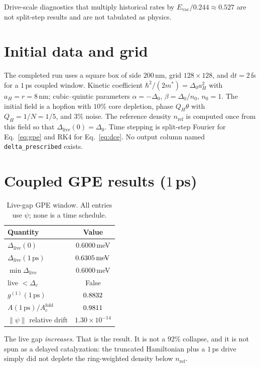 \documentclass[11pt,letterpaper]{article}
\begin{document}
Drive-scale diagnostics that multiply historical rates by $E_{\mathrm{vac}}/0.244\approx 0.527$ are not split-step results and are not tabulated as physics.

\section{Initial data and grid}
\label{sec:grid}

The completed run uses a square box of side $200$\,nm, grid $128\times 128$, and $\mathrm{d}t=2$\,fs for a $1$\,ps coupled window. Kinetic coefficient $\hbar^2/(2m^*)=\Delta_0 a_H^2$ with $a_H=r=8$\,nm; cubic--quintic parameters $\alpha=-\Delta_0$, $\beta=\Delta_0/n_0$, $n_0=1$. The initial field is a hopfion with $10\%$ core depletion, phase $Q_H\theta$ with $Q_H=1/N=1/5$, and $3\%$ noise. The reference density $n_{\mathrm{ref}}$ is computed once from this field so that $\Delta_{\mathrm{live}}(0)=\Delta_0$. Time stepping is split-step Fourier for Eq.~\eqref{eq:gpe} and RK4 for Eq.~\eqref{eq:dce}. No output column named \texttt{delta\_prescribed} exists.

\section{Coupled GPE results ($1$\,ps)}
\label{sec:coupled}

\begin{table}[H]
\centering
\caption{Live-gap GPE window. All entries use $\psi$; none is a time schedule.}
\label{tab:gpe}
\begin{tabular}{@{}lc@{}}
\toprule
Quantity & Value \\
\midrule
$\Delta_{\mathrm{live}}(0)$ & $0.6000$\,meV \\
$\Delta_{\mathrm{live}}(1\,\mathrm{ps})$ & $0.6305\,\mathrm{meV}$ \\
$\min\Delta_{\mathrm{live}}$ & $0.6000$\,meV \\
live ${}<{}\Delta_c$ & False \\
$g^{(1)}(1\,\mathrm{ps})$ & $0.8832$ \\
$A(1\,\mathrm{ps})/A_c^{\mathrm{fold}}$ & $0.9811$ \\
$\|\psi\|$ relative drift & $1.30\times 10^{-14}$ \\
\bottomrule
\end{tabular}
\end{table}

The live gap \emph{increases}. That is the result. It is not a $92\%$ collapse, and it is not spun as a delayed catalyzation: the truncated Hamiltonian plus a $1$\,ps drive simply did not deplete the ring-weighted density below $n_{\mathrm{ref}}$.
\end{document}
